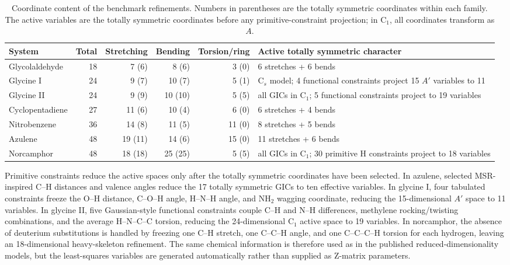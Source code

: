 \documentclass[journal=jctcce,manuscript=article,maxauthors=999]{achemso}
\begin{document}
\begin{table}
\caption{Coordinate content of the benchmark refinements. Numbers in parentheses are the totally symmetric coordinates within each family. The active variables are the totally symmetric coordinates before any primitive-constraint projection; in C$_1$, all coordinates transform as $A$.}
\label{tab:coordinate-content}
\scriptsize
\begin{tabular}{lrrrrp{}}
\toprule
System & Total & Stretching & Bending & Torsion/ring & Active totally symmetric character \\
\midrule
Glycolaldehyde & 18 & 7 (6) & 8 (6) & 3 (0) & 6 stretches + 6 bends \\
Glycine I & 24 & 9 (7) & 10 (7) & 5 (1) & C$_s$ model; 4 functional constraints project 15 $A'$ variables to 11 \\
Glycine II & 24 & 9 (9) & 10 (10) & 5 (5) & all GICs in C$_1$; 5 functional constraints project to 19 variables \\
Cyclopentadiene & 27 & 11 (6) & 10 (4) & 6 (0) & 6 stretches + 4 bends \\
Nitrobenzene & 36 & 14 (8) & 11 (5) & 11 (0) & 8 stretches + 5 bends \\
Azulene & 48 & 19 (11) & 14 (6) & 15 (0) & 11 stretches + 6 bends \\
Norcamphor & 48 & 18 (18) & 25 (25) & 5 (5) & all GICs in C$_1$; 30 primitive H constraints project to 18 variables \\
\bottomrule
\end{tabular}
\end{table}

Primitive constraints reduce the active spaces only after the totally
symmetric coordinates have been selected. In azulene, selected MSR-inspired
C--H distances and valence angles reduce the 17 totally symmetric GICs to ten
effective variables. In glycine I, four tabulated constraints freeze the
O--H distance, C--O--H angle, H--N--H angle, and NH$_2$ wagging coordinate,
reducing the 15-dimensional $A'$ space to 11 variables. In glycine II, five
Gaussian-style functional constraints
couple C--H and N--H differences, methylene rocking/twisting combinations, and
the average H--N--C--C torsion, reducing the 24-dimensional C$_1$ active
space to 19 variables. In norcamphor, the absence of deuterium substitutions is
handled by freezing one C--H stretch, one C--C--H angle, and one C--C--C--H
torsion for each hydrogen, leaving an 18-dimensional heavy-skeleton
refinement. The same chemical information is therefore used as in the
published reduced-dimensionality models, but the least-squares variables are
generated automatically rather than supplied as Z-matrix parameters.
\end{document}
